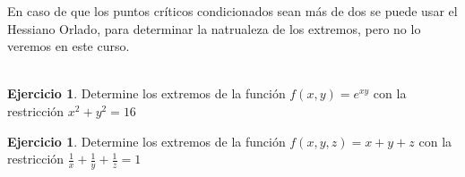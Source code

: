 \documentclass{article}
\theoremstyle{plain}
\theoremstyle{definition}
\newtheorem{ejer}[thm]{Ejercicio}
\begin{document}
En caso de que los puntos críticos condicionados sean más de dos se puede usar el Hessiano Orlado, para determinar la natrualeza de los extremos, pero no lo veremos en este curso. \\ \\


\begin{ejer}Determine  los extremos de la funci\'on $f(x,y) = e^{xy}$ con la restricci\'on $x^2+y^2=16$ \\
\end{ejer}

\begin{ejer}Determine  los extremos de la funci\'on $f(x,y,z) = x+y+z$ con la restricci\'on $\frac{1}{x}+\frac{1}{y}+\frac{1}{z} = 1$ \\
\end{ejer}
\end{document}
